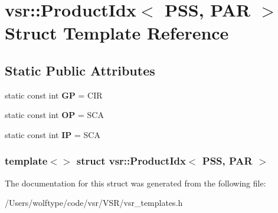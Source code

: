 \hypertarget{structvsr_1_1_product_idx_3_01_p_s_s_00_01_p_a_r_01_4}{\section{vsr\-:\-:Product\-Idx$<$ P\-S\-S, P\-A\-R $>$ Struct Template Reference}
\label{structvsr_1_1_product_idx_3_01_p_s_s_00_01_p_a_r_01_4}
}
\subsection*{Static Public Attributes}
\begin{DoxyCompactItemize}
\item 
\hypertarget{structvsr_1_1_product_idx_3_01_p_s_s_00_01_p_a_r_01_4_ab6f5512e892507d116ac5532499f3843}{static const int {\bfseries G\-P} = C\-I\-R}\label{structvsr_1_1_product_idx_3_01_p_s_s_00_01_p_a_r_01_4_ab6f5512e892507d116ac5532499f3843}

\item 
\hypertarget{structvsr_1_1_product_idx_3_01_p_s_s_00_01_p_a_r_01_4_a0b0a4db89ba8828d403ca9ba68027108}{static const int {\bfseries O\-P} = S\-C\-A}\label{structvsr_1_1_product_idx_3_01_p_s_s_00_01_p_a_r_01_4_a0b0a4db89ba8828d403ca9ba68027108}

\item 
\hypertarget{structvsr_1_1_product_idx_3_01_p_s_s_00_01_p_a_r_01_4_a96f3f1f6a979a4c345ea33ccacaa3593}{static const int {\bfseries I\-P} = S\-C\-A}\label{structvsr_1_1_product_idx_3_01_p_s_s_00_01_p_a_r_01_4_a96f3f1f6a979a4c345ea33ccacaa3593}

\end{DoxyCompactItemize}
\subsubsection*{template$<$$>$ struct vsr\-::\-Product\-Idx$<$ P\-S\-S, P\-A\-R $>$}



The documentation for this struct was generated from the following file\-:\begin{DoxyCompactItemize}
\item 
/\-Users/wolftype/code/vsr/\-V\-S\-R/vsr\-\_\-templates.\-h\end{DoxyCompactItemize}
